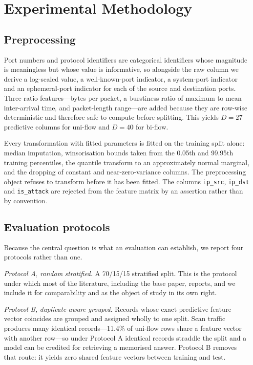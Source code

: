 \section{Experimental Methodology}
\label{sec:methodology}

\subsection{Preprocessing}

Port numbers and protocol identifiers are categorical identifiers whose
magnitude is meaningless but whose value is informative, so alongside the raw
column we derive a log-scaled value, a well-known-port indicator, a
system-port indicator and an ephemeral-port indicator for each of the source
and destination ports. Three ratio features---bytes per packet, a burstiness
ratio of maximum to mean inter-arrival time, and packet-length range---are
added because they are row-wise deterministic and therefore safe to compute
before splitting. This yields $D = 27$ predictive columns for uni-flow and
$D = 40$ for bi-flow.

Every transformation with fitted parameters is fitted on the training split
alone: median imputation, winsorisation bounds taken from the 0.05th and
99.95th training percentiles, the quantile transform to an approximately normal
marginal, and the dropping of constant and near-zero-variance columns. The
preprocessing object refuses to transform before it has been fitted. The
columns \texttt{ip\_src}, \texttt{ip\_dst} and \texttt{is\_attack} are
rejected from the feature matrix by an assertion rather than by convention.

\subsection{Evaluation protocols}

Because the central question is what an evaluation can establish, we report
four protocols rather than one.

\emph{Protocol A, random stratified.} A 70/15/15 stratified split. This is the
protocol under which most of the literature, including the base paper, reports,
and we include it for comparability and as the object of study in its own
right.

\emph{Protocol B, duplicate-aware grouped.} Records whose exact predictive
feature vector coincides are grouped and assigned wholly to one split. Scan
traffic produces many identical records---11.4\% of uni-flow rows share a
feature vector with another row---so under Protocol A identical records
straddle the split and a model can be credited for retrieving a memorised
answer. Protocol B removes that route: it yields zero shared feature vectors
between training and test.

